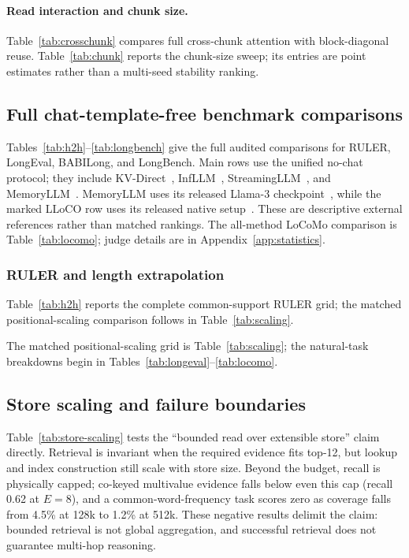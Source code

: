 \paragraph{Read interaction and chunk size.}
Table~\ref{tab:crosschunk} compares full cross-chunk attention with
block-diagonal reuse. Table~\ref{tab:chunk} reports the chunk-size sweep; its
entries are point estimates rather than a multi-seed stability ranking.


\subsection{Full chat-template-free benchmark comparisons}
\label{app:tasks}
Tables~\ref{tab:h2h}--\ref{tab:longbench} give the full audited comparisons for
RULER, LongEval, BABILong, and LongBench. Main rows use the unified no-chat
protocol; they include KV-Direct~\citep{kvdirect}, InfLLM~\citep{infllm},
StreamingLLM~\citep{streamingllm}, and MemoryLLM~\citep{memoryllm}. MemoryLLM
uses its released Llama-3 checkpoint~\citep{llama3}, while the marked LLoCO
row uses its released native setup~\citep{lloco}. These are descriptive external
references rather than matched rankings.
The all-method LoCoMo comparison is Table~\ref{tab:locomo}; judge details are in
Appendix~\ref{app:statistics}.


\FloatBarrier
\subsubsection{RULER and length extrapolation}
Table~\ref{tab:h2h} reports the complete common-support RULER grid; the
matched positional-scaling comparison follows in Table~\ref{tab:scaling}.

The matched positional-scaling grid is Table~\ref{tab:scaling}; the natural-task breakdowns begin in Tables~\ref{tab:longeval}--\ref{tab:locomo}.






\FloatBarrier
\subsection{Store scaling and failure boundaries}
\label{app:scaling}
Table~\ref{tab:store-scaling} tests the ``bounded read over extensible store''
claim directly. Retrieval is invariant when the required evidence fits top-12,
but lookup and index construction still scale with store size. Beyond the budget,
recall is physically capped; co-keyed multivalue evidence falls below even this
cap (recall 0.62 at $E{=}8$), and a common-word-frequency task scores zero as
coverage falls from 4.5\% at 128k to 1.2\% at 512k. These negative results delimit
the claim: bounded retrieval is not global aggregation, and successful retrieval
does not guarantee multi-hop reasoning.


